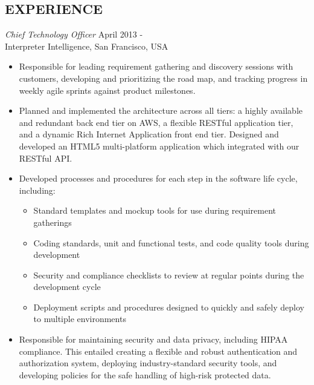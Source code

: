 \documentclass[line,margin]{res}
\begin{document}
\begin{resume}
\section{EXPERIENCE} 
{\sl Chief Technology Officer} \hfill April 2013 - \\
                Interpreter Intelligence, 
                San Francisco, USA
                 \vspace{-5mm}
                 \begin{itemize}  \itemsep -2pt %
                 \item Responsible for leading requirement gathering and discovery sessions with customers, 
                 developing and prioritizing the road map, and tracking progress in weekly agile sprints against
                 product milestones.
                 \item Planned and implemented the architecture across all tiers: a highly available and redundant
                 back end tier on AWS, a flexible RESTful application tier, and a dynamic Rich Internet Application
                 front end tier. Designed and developed an HTML5 multi-platform application which integrated with
                 our RESTful API.
                 \item Developed processes and procedures for each step in the software life cycle, including:
                 \begin{itemize}
                 \item Standard templates and mockup tools for use during requirement gatherings
                 \item Coding standards, unit and functional tests, and code quality tools during development
                 \item Security and compliance checklists to review at regular points during the development cycle
                 \item Deployment scripts and procedures designed to quickly and safely deploy to multiple environments
                 \end{itemize}
                 \item Responsible for maintaining security and data privacy, including HIPAA compliance. This entailed
                 creating a flexible and robust authentication and authorization system, deploying industry-standard security tools,
                 and developing policies for the safe handling of high-risk protected data.
                 \end{itemize}


\end{resume}
\end{document}
